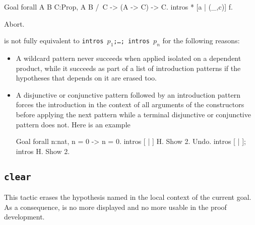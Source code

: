 \begin{coq_example*}
\Example

\begin{coq_example}
Goal forall A B C:Prop, A \/ B /\ C -> (A -> C) -> C.
intros * [a | (_,c)] f.
\end{coq_example}
\begin{coq_eval}
Abort.
\end{coq_eval}

 is not fully equivalent to
\texttt{intros $p_1$;\ldots; intros $p_n$} for the following reasons:
\begin{itemize}
\item A wildcard pattern never succeeds when applied isolated on a
  dependent product, while it succeeds as part of a list of
  introduction patterns if the hypotheses that depends on it are
  erased too.
\item A disjunctive or conjunctive pattern followed by an introduction
  pattern forces the introduction in the context of all arguments of
  the constructors before applying the next pattern while a terminal
  disjunctive or conjunctive pattern does not. Here is an example

\begin{coq_example}
Goal forall n:nat, n = 0 -> n = 0.
intros [ | ] H.
Show 2.
Undo.
intros [ | ]; intros H.
Show 2.
\end{coq_example}

\end{itemize}

\subsection{\tt clear \ident}
\label{clear}

This tactic erases the hypothesis named {\ident} in the local context
of the current goal. As a consequence, {\ident} is no more displayed and no more
usable in the proof development.

\begin{ErrMsgs}
\item {}
\item {}
\item {}
\end{ErrMsgs}

\begin{Variants}


\end{Variants}
\end{coq_example*}
